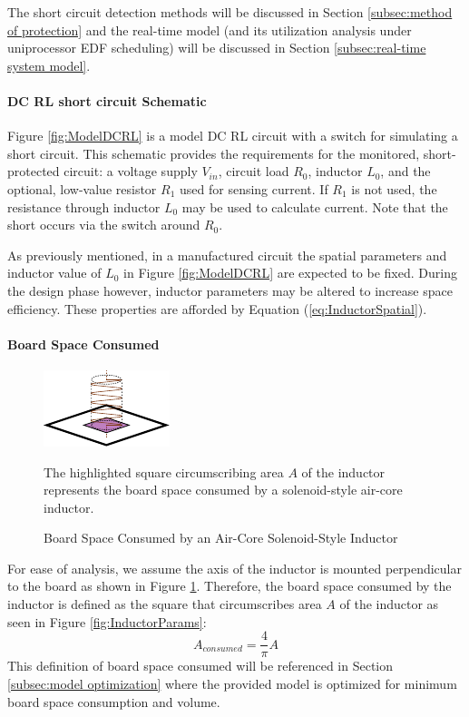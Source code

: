 The short circuit detection methods will be discussed in Section \ref{subsec:method of protection} and the real-time model (and its utilization analysis under uniprocessor EDF scheduling) will be discussed in Section \ref{subsec:real-time system model}.

\paragraph{DC RL short circuit Schematic}
Figure \ref{fig:ModelDCRL} is a model DC RL circuit with a switch for simulating a short circuit.
This schematic provides the requirements for the monitored, short-protected circuit: a voltage supply $V_{in}$, circuit load $R_{0}$, inductor $L_{0}$, and the optional, low-value resistor $R_{1}$ used for sensing current.
If $R_{1}$ is not used, the resistance through inductor $L_{0}$ may be used to calculate current.
Note that the short occurs via the switch around $R_{0}$.

As previously mentioned, in a manufactured circuit the spatial parameters and inductor value of $L_0$ in Figure \ref{fig:ModelDCRL} are expected to be fixed.
During the design phase however, inductor parameters may be altered to increase space efficiency.
These properties are afforded by Equation (\ref{eq:InductorSpatial}).

\paragraph{Board Space Consumed}
\begin{figure}
    \centering
    \includegraphics[scale=2.0]{fig/Inductor_Perpendicular_Mount.pdf}
    \caption{Board Space Consumed by an Air-Core Solenoid-Style Inductor} The highlighted square circumscribing area $A$ of the inductor represents the board space consumed by a solenoid-style air-core inductor.
    \label{fig:BoardSpaceConsumed}
\end{figure}
For ease of analysis, we assume the axis of the inductor is mounted perpendicular to the board as shown in Figure \ref{fig:BoardSpaceConsumed}.
Therefore, the board space consumed by the inductor is defined as the square that circumscribes area $A$ of the inductor as seen in Figure \ref{fig:InductorParams}:
\begin{equation}\label{eq:AreaConsumed}
A_{consumed} = \frac{4}{\pi}A
\end{equation}
This definition of board space consumed will be referenced in Section \ref{subsec:model optimization} where the provided model is optimized for minimum board space consumption and volume.
